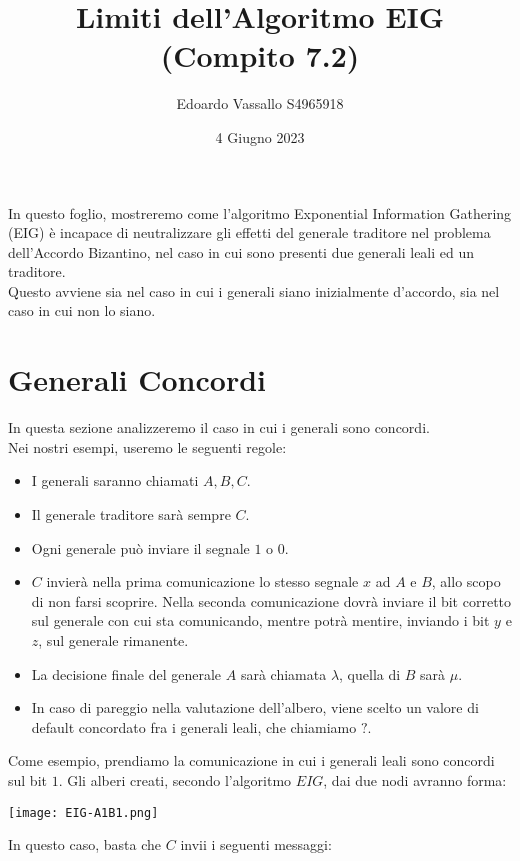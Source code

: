 \documentclass{article}
\title{Limiti dell'Algoritmo EIG (Compito 7.2)}
\author{Edoardo Vassallo S4965918}
\date{4 Giugno 2023}
\begin{document}
\maketitle

In questo foglio, mostreremo come l'algoritmo Exponential Information Gathering (EIG) è incapace di neutralizzare gli effetti del generale traditore nel problema dell'Accordo Bizantino, nel caso in cui sono presenti due generali leali ed un traditore. \\
Questo avviene sia nel caso in cui i generali siano inizialmente d'accordo, sia nel caso in cui non lo siano.

\section{Generali Concordi}
In questa sezione analizzeremo il caso in cui i generali sono concordi.\\

Nei nostri esempi, useremo le seguenti regole:
\begin{itemize}
    \item I generali saranno chiamati $A, B, C$.
    \item Il generale traditore sarà sempre $C$.
    \item Ogni generale può inviare il segnale $1$ o $0$.
    \item $C$ invierà nella prima comunicazione lo stesso segnale $x$ ad $A$ e $B$, allo scopo di non farsi scoprire. Nella seconda comunicazione dovrà inviare il bit corretto sul generale con cui sta comunicando, mentre potrà mentire, inviando i bit $y$ e $z$, sul generale rimanente.
    \item La decisione finale del generale $A$ sarà chiamata $\lambda$, quella di $B$ sarà $\mu$.
    \item In caso di pareggio nella valutazione dell'albero, viene scelto un valore di default concordato fra i generali leali, che chiamiamo $?$.
\end{itemize}   

Come esempio, prendiamo la comunicazione in cui i generali leali sono concordi sul bit $1$. Gli alberi creati, secondo l'algoritmo $EIG$, dai due nodi avranno forma:

\begin{center}
    \texttt{[image: EIG-A1B1.png]}
\end{center}

In questo caso, basta che $C$ invii i seguenti messaggi:
\end{document}

